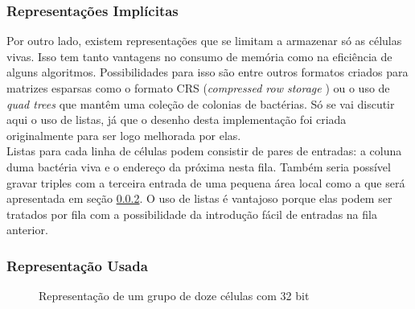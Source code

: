 \subsubsection{Representações Implícitas}

Por outro lado, existem representações que se limitam a armazenar só as células vivas. Isso tem tanto vantagens no consumo de memória como na eficiência de alguns algoritmos. Possibilidades para isso são entre outros formatos criados para matrizes esparsas como o formato CRS (\textit{compressed row storage }) ou o uso de \textit{quad trees} que mantêm uma coleção de colonias de bactérias. Só se vai discutir aqui o uso de listas, já  que o desenho desta implementação foi criada originalmente para ser logo  melhorada por elas. \\

Listas para cada linha de células podem consistir de pares de entradas: a coluna duma bactéria viva e o endereço da próxima nesta fila. Também seria possível gravar triples com a terceira entrada de uma pequena área local como a que será apresentada em seção \ref{sec:representacao_usada}. O uso de listas é vantajoso porque elas podem ser tratados por fila com a possibilidade da introdução fácil de entradas na fila anterior. 


\subsubsection{Representação Usada}
\label{sec:representacao_usada}

\begin{figure}[h]
\centering

\caption{Representação de um grupo de doze células com 32 bit }
\label{fig:representacao}
\end{figure}

